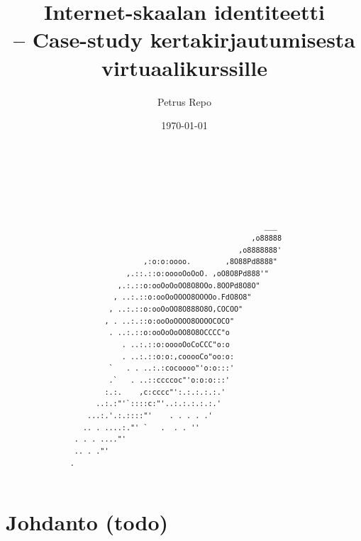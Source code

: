 \documentclass[finnish,gradu]{tktltiki}
\makeatletter
\newcommand{\gradutableofcontents}{%
  \tableofcontents
  \newpage
  \listoffigures
  \newpage
  \pagenumbering{arabic}
  \if@emptyfirstpagenumber
    \thispagestyle{empty}
  \fi
}
\makeatother
\begin{document}
\title{Internet-skaalan identiteetti
    \\ -- Case-study kertakirjautumisesta virtuaalikurssille}

\author{Petrus Repo}
\date{\today}
\maketitle

\onehalfspacing

\subject{Tietojenkäsittelytiede}


\begin{abstract}
  \begin{singlespacing}
  \begin{verbatim}






                                                        ___
                                                     ,o88888
                                                  ,o8888888'
                            ,:o:o:oooo.        ,8O88Pd8888"
                        ,.::.::o:ooooOoOoO. ,oO8O8Pd888'"
                      ,.:.::o:ooOoOoOO8O8OOo.8OOPd8O8O"
                     , ..:.::o:ooOoOOOO8OOOOo.FdO8O8"
                    , ..:.::o:ooOoOO8O888O8O,COCOO"
                   , . ..:.::o:ooOoOOOO8OOOOCOCO"
                    . ..:.::o:ooOoOoOO8O8OCCCC"o
                       . ..:.::o:ooooOoCoCCC"o:o
                       . ..:.::o:o:,cooooCo"oo:o:
                    `   . . ..:.:cocoooo"'o:o:::'
                    .`   . ..::ccccoc"'o:o:o:::'
                   :.:.    ,c:cccc"':.:.:.:.:.'
                 ..:.:"'`::::c:"'..:.:.:.:.:.'
               ...:.'.:.::::"'    . . . . .'
              .. . ....:."' `   .  . . ''
            . . . ...."'
            .. . ."'
           .

  \end{verbatim}
  \end{singlespacing}
\end{abstract}

\setcounter{tocdepth}{3}
\gradutableofcontents

\section{Johdanto (todo)} %
\label{sec:johdanto}
\end{document}

